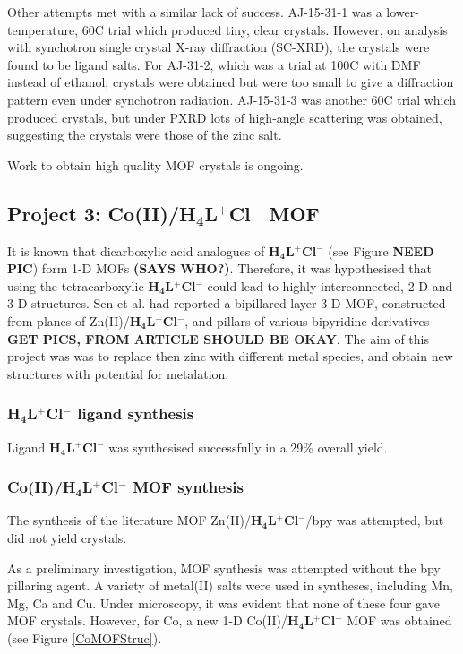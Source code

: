 \documentclass[12pt,a4paper]{article}
\begin{document}
Other attempts met with a similar lack of success. AJ-15-31-1 was a lower-temperature, 60\degree C trial which produced tiny, clear crystals. However, on analysis with synchotron single crystal X-ray diffraction (SC-XRD), the crystals were found to be ligand salts. For AJ-31-2, which was a trial at 100\degree C with DMF instead of ethanol, crystals were obtained but were too small to give a diffraction pattern even under synchotron radiation. AJ-15-31-3 was another 60\degree C trial which produced crystals, but under PXRD lots of high-angle scattering was obtained, suggesting the crystals were those of the zinc salt.

Work to obtain high quality MOF crystals is ongoing.

\subsection{Project 3: Co(II)/\textbf{H$\bm{_4}$L$\bm{^+}$Cl$\bm{^-}$} MOF}\label{sec:dis-co}
It is known that dicarboxylic acid analogues of \textbf{H$\bm{_4}$L$\bm{^+}$Cl$\bm{^-}$} (see Figure \textbf{NEED PIC}) form 1-D MOFs \textbf{(SAYS WHO?)}. Therefore, it was hypothesised that using the tetracarboxylic \textbf{H$\bm{_4}$L$\bm{^+}$Cl$\bm{^-}$} could lead to highly interconnected, 2-D and 3-D structures. Sen et al.\cite{sen2014construction} had reported a bipillared-layer 3-D MOF, constructed from planes of Zn(II)/\textbf{H$\bm{_4}$L$\bm{^+}$Cl$\bm{^-}$}, and pillars of various bipyridine derivatives \textbf{GET PICS, FROM ARTICLE SHOULD BE OKAY}. The aim of this project was was to replace then zinc with different metal species, and obtain new structures with potential for metalation.

\subsubsection{\textbf{H$\bm{_4}$L$\bm{^+}$Cl$\bm{^-}$} ligand synthesis}\label{sec:dis-H4L}
Ligand \textbf{H$\bm{_4}$L$\bm{^+}$Cl$\bm{^-}$} was synthesised successfully in a 29\% overall yield.

\subsubsection{Co(II)/\textbf{H$\bm{_4}$L$\bm{^+}$Cl$\bm{^-}$} MOF synthesis}\label{sec:dis-CoMOF}
The synthesis of the literature MOF Zn(II)/\textbf{H$\bm{_4}$L$\bm{^+}$Cl$\bm{^-}$}/bpy was attempted, but did not yield crystals.

As a preliminary investigation, MOF synthesis was attempted without the bpy pillaring agent. A variety of metal(II) salts were used in syntheses, including Mn, Mg, Ca and Cu. Under microscopy, it was evident that none of these four gave MOF crystals. However, for Co, a new 1-D Co(II)/\textbf{H$\bm{_4}$L$\bm{^+}$Cl$\bm{^-}$} MOF was obtained (see Figure \ref{CoMOFStruc}).
\end{document}
